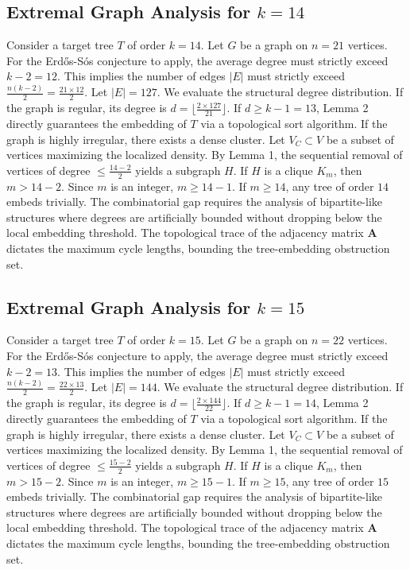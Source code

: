 \documentclass[11pt,a4paper]{article}
\begin{document}
\subsection{Extremal Graph Analysis for $k=14$}
Consider a target tree $T$ of order $k=14$.
Let $G$ be a graph on $n=21$ vertices.
For the Erd\H{o}s-S\'os conjecture to apply, the average degree must strictly exceed $k-2 = 12$.
This implies the number of edges $|E|$ must strictly exceed $\frac{n(k-2)}{2} = \frac{21 \times 12}{2}$.
Let $|E| = 127$.
We evaluate the structural degree distribution. If the graph is regular, its degree is $d = \lfloor \frac{2 \times 127}{21} \rfloor$.
If $d \geq k-1 = 13$, Lemma 2 directly guarantees the embedding of $T$ via a topological sort algorithm.
If the graph is highly irregular, there exists a dense cluster. Let $V_C \subset V$ be a subset of vertices maximizing the localized density.
By Lemma 1, the sequential removal of vertices of degree $\leq \frac{14-2}{2}$ yields a subgraph $H$.
If $H$ is a clique $K_{m}$, then $m > 14-2$. Since $m$ is an integer, $m \geq 14-1$. If $m \geq 14$, any tree of order $14$ embeds trivially.
The combinatorial gap requires the analysis of bipartite-like structures where degrees are artificially bounded without dropping below the local embedding threshold. The topological trace of the adjacency matrix $\mathbf{A}$ dictates the maximum cycle lengths, bounding the tree-embedding obstruction set.


\subsection{Extremal Graph Analysis for $k=15$}
Consider a target tree $T$ of order $k=15$.
Let $G$ be a graph on $n=22$ vertices.
For the Erd\H{o}s-S\'os conjecture to apply, the average degree must strictly exceed $k-2 = 13$.
This implies the number of edges $|E|$ must strictly exceed $\frac{n(k-2)}{2} = \frac{22 \times 13}{2}$.
Let $|E| = 144$.
We evaluate the structural degree distribution. If the graph is regular, its degree is $d = \lfloor \frac{2 \times 144}{22} \rfloor$.
If $d \geq k-1 = 14$, Lemma 2 directly guarantees the embedding of $T$ via a topological sort algorithm.
If the graph is highly irregular, there exists a dense cluster. Let $V_C \subset V$ be a subset of vertices maximizing the localized density.
By Lemma 1, the sequential removal of vertices of degree $\leq \frac{15-2}{2}$ yields a subgraph $H$.
If $H$ is a clique $K_{m}$, then $m > 15-2$. Since $m$ is an integer, $m \geq 15-1$. If $m \geq 15$, any tree of order $15$ embeds trivially.
The combinatorial gap requires the analysis of bipartite-like structures where degrees are artificially bounded without dropping below the local embedding threshold. The topological trace of the adjacency matrix $\mathbf{A}$ dictates the maximum cycle lengths, bounding the tree-embedding obstruction set.
\end{document}
